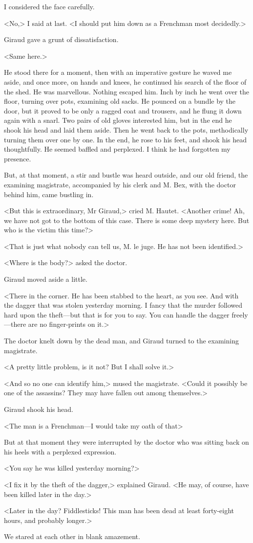  I considered the face carefully. 

 <No,> I said at last. <I should put him down as a Frenchman most decidedly.> 

 Giraud gave a grunt of dissatisfaction. 

 <Same here.> 

 He stood there for a moment, then with an imperative gesture he waved me aside, and once more, on hands and knees, he continued his search of the floor of the shed. He was marvellous. Nothing escaped him. Inch by inch he went over the floor, turning over pots, examining old sacks. He pounced on a bundle by the door, but it proved to be only a ragged coat and trousers, and he flung it down again with a snarl. Two pairs of old gloves interested him, but in the end he shook his head and laid them aside. Then he went back to the pots, methodically turning them over one by one. In the end, he rose to his feet, and shook his head thoughtfully. He seemed baffled and perplexed. I think he had forgotten my presence. 

 But, at that moment, a stir and bustle was heard outside, and our old friend, the examining magistrate, accompanied by his clerk and M. Bex, with the doctor behind him, came bustling in. 

 <But this is extraordinary, Mr Giraud,> cried M. Hautet. <Another crime! Ah, we have not got to the bottom of this case. There is some deep mystery here. But who is the victim this time?> 

 <That is just what nobody can tell us, M. le juge. He has not been identified.> 

 <Where is the body?> asked the doctor. 

 Giraud moved aside a little. 

 <There in the corner. He has been stabbed to the heart, as you see. And with the dagger that was stolen yesterday morning. I fancy that the murder followed hard upon the theft—but that is for you to say. You can handle the dagger freely—there are no finger-prints on it.> 

 The doctor knelt down by the dead man, and Giraud turned to the examining magistrate. 

 <A pretty little problem, is it not? But I shall solve it.> 

 <And so no one can identify him,> mused the magistrate. <Could it possibly be one of the assassins? They may have fallen out among themselves.> 

 Giraud shook his head. 

 <The man is a Frenchman—I would take my oath of that\longdash> 

 But at that moment they were interrupted by the doctor who was sitting back on his heels with a perplexed expression. 

 <You say he was killed yesterday morning?> 

 <I fix it by the theft of the dagger,> explained Giraud. <He may, of course, have been killed later in the day.> 

 <Later in the day? Fiddlesticks! This man has been dead at least forty-eight hours, and probably longer.> 

 We stared at each other in blank amazement.